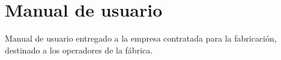 
\chapter{Manual de usuario} %

\label{Appendix_usermanual} %

Manual de usuario entregado a la empresa contratada para la fabricación, destinado a los operadores de la fábrica.

\newpage



